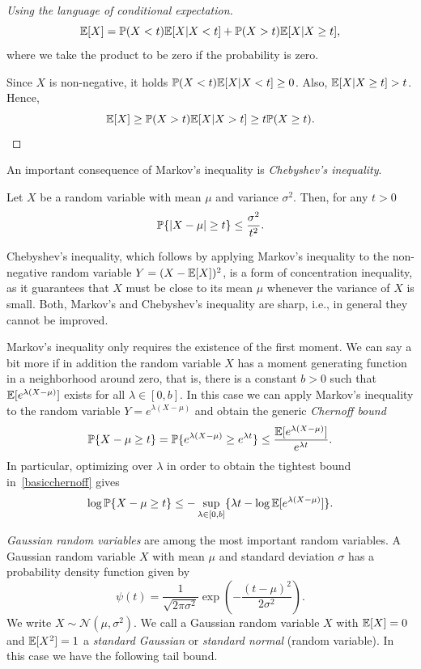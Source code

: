 \begin{proof}[Using the language of conditional expectation]
$$\E[X] = \P(X<t) \E[X | X<t] + \P(X>t) \E[X | X\geq t], $$
where we take the product to be zero if the probability is zero.

Since $X$ is non-negative, it holds $ \P(X<t) \E[X | X<t] \geq 0$. Also,  $\E[X | X \geq t] > t$. Hence,
$$\E[X] \ge \P(X>t) \E[X | X>t] \ge t \P(X \geq t).$$

\end{proof}

An important consequence of Markov's inequality is  {\em Chebyshev's inequality}.
\begin{corollary}\label{chebyshev}
Let $X$ be a random variable with mean $\mu$ and variance $\sigma^2$. Then, for any $t>0$
\begin{equation}
\label{chebyshev}
\P \{ | X - \mu | \ge t \} \le \frac{ \sigma^2 }{ t^2}.
\end{equation}
\end{corollary}

Chebyshev's inequality, which follows by applying Markov's inequality to the non-negative random variable $Y = (X - \E[X])^2$, is a form of concentration inequality, as it guarantees that $X$ must be close to its mean $\mu$ whenever the variance of $X$ is small. Both, Markov's and Chebyshev's inequality are sharp, i.e., in general they cannot be improved.

Markov's inequality only requires the existence of the first moment. We can say a bit more if in addition the random variable $X$ has a moment generating function
in a neighborhood around zero, that is, there is a constant $b>0$ such that $\E [ e^{\lambda (X-\mu)}]$ exists for all $\lambda \in [0,b]$.
In this case we can apply Markov's inequality to the random variable $Y = e^{\lambda (X-\mu)}$ and obtain the generic {\em Chernoff bound}
\begin{equation}\label{basicchernoff}
\P \{ X -\mu \ge t \} = \P \{ e^{\lambda (X-\mu)} \ge e^{\lambda t} \} \le \frac{ \E[e^{\lambda (X-\mu)}] }{ e^{\lambda t} }.
\end{equation}
In particular, optimizing over $\lambda$ in order to obtain the tightest bound in~\eqref{basicchernoff} gives
$$
\log \P \{ X -\mu \ge t \} \le - \sup_{ \lambda \in [0,b]}  \{ \lambda t - \log \E[e^{\lambda (X-\mu)} ]  \}.
$$


\bigskip
{\em Gaussian random variables} are among the most important random variables.
A Gaussian random variable $X$ with mean $\mu$ and standard deviation $\sigma$ has a probability density function given by
\begin{equation} \label{def:gaussian}
\psi(t) = \frac{1}{\sqrt{2 \pi \sigma^2}} \exp\left( - \frac{(t-\mu)^2}{2\sigma^2}  \right).
\end{equation}
We write $X \sim {\mathcal N}(\mu,\sigma^2)$.
We call a Gaussian random variable $X$ with $\E[X] = 0$ and $\E[X^2] = 1$  a {\em standard Gaussian} or {\em standard normal}  (random
variable). In this case we have the following tail bound.


